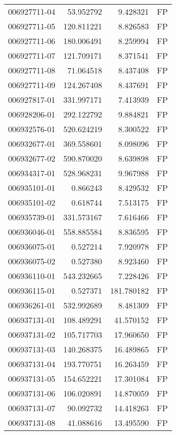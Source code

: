 \begin{tabular}{lrrl}
006927711-04 &   53.952792 &     9.428321 &   FP \\
006927711-05 &  120.811221 &     8.826583 &   FP \\
006927711-06 &  180.006491 &     8.259994 &   FP \\
006927711-07 &  121.709171 &     8.371541 &   FP \\
006927711-08 &   71.064518 &     8.437408 &   FP \\
006927711-09 &  124.267408 &     8.437691 &   FP \\
006927817-01 &  331.997171 &     7.413939 &   FP \\
006928206-01 &  292.122792 &     9.884821 &   FP \\
006932576-01 &  520.624219 &     8.300522 &   FP \\
006932677-01 &  369.558601 &     8.098096 &   FP \\
006932677-02 &  590.870020 &     8.639898 &   FP \\
006934317-01 &  528.968231 &     9.967988 &   FP \\
006935101-01 &    0.866243 &     8.429532 &   FP \\
006935101-02 &    0.618744 &     7.513175 &   FP \\
006935739-01 &  331.573167 &     7.616466 &   FP \\
006936046-01 &  558.885584 &     8.836595 &   FP \\
006936075-01 &    0.527214 &     7.920978 &   FP \\
006936075-02 &    0.527380 &     8.923460 &   FP \\
006936110-01 &  543.232665 &     7.228426 &   FP \\
006936115-01 &    0.527371 &   181.780182 &   FP \\
006936261-01 &  532.992689 &     8.481309 &   FP \\
006937131-01 &  108.489291 &    41.570152 &   FP \\
006937131-02 &  105.717703 &    17.960650 &   FP \\
006937131-03 &  140.268375 &    16.489865 &   FP \\
006937131-04 &  193.770751 &    16.263459 &   FP \\
006937131-05 &  154.652221 &    17.301084 &   FP \\
006937131-06 &  106.020891 &    14.870059 &   FP \\
006937131-07 &   90.092732 &    14.418263 &   FP \\
006937131-08 &   41.088616 &    13.495590 &   FP \\

\end{tabular}
